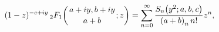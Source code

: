 \[(1-z)^{-c+iy}\mathop{{{}_{2}F_{1}}\/}\nolimits\!\left({a+iy,b+iy\atop a+b};z%
\right)=\sum_{n=0}^{\infty}\frac{\mathop{S_{n}\/}\nolimits\!\left(y^{2};a,b,c%
\right)}{\left(a+b\right)_{n}n!}z^{n},\]